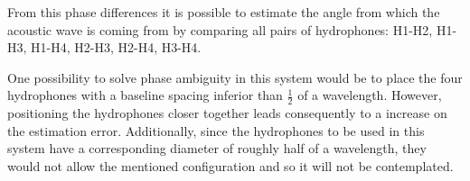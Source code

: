 From this phase differences it is possible to estimate the angle from which the acoustic wave is coming from by comparing all pairs of hydrophones: H1-H2, H1-H3, H1-H4, H2-H3, H2-H4, H3-H4. 

One possibility to solve phase ambiguity in this system would be to place the four hydrophones with a baseline spacing inferior than $\frac{1}{2}$ of a wavelength. However, positioning the hydrophones closer together leads consequently to a increase on the estimation error. Additionally, since the hydrophones to be used in this system have a corresponding diameter of roughly half of a wavelength, they would not allow the mentioned configuration and so it will not be contemplated.

